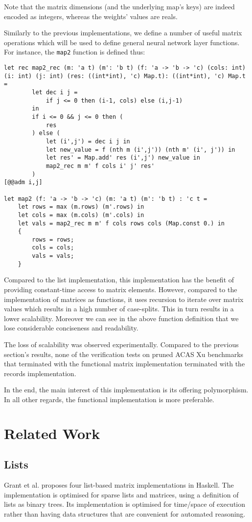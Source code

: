 \documentclass[runningheads]{llncs}
\begin{document}
Note that the matrix dimensions (and the underlying map's keys) are indeed encoded as integers, whereas the weights' values are reals. 

Similarly to the previous implementations, we define a number of useful matrix operations which will be used to define general neural network layer functions. For instance, the \lstinline{map2} function is defined thus:

\begin{lstlisting}[language=caml, label={lst:map2_records}]
let rec map2_rec (m: 'a t) (m': 'b t) (f: 'a -> 'b -> 'c) (cols: int) (i: int) (j: int) (res: ((int*int), 'c) Map.t): ((int*int), 'c) Map.t =
		let dec i j = 
			if j <= 0 then (i-1, cols) else (i,j-1)     
		in
		if i <= 0 && j <= 0 then (
			res
		) else (
			let (i',j') = dec i j in
			let new_value = f (nth m (i',j')) (nth m' (i', j')) in
			let res' = Map.add' res (i',j') new_value in
			map2_rec m m' f cols i' j' res'
		)
[@@adm i,j]

let map2 (f: 'a -> 'b -> 'c) (m: 'a t) (m': 'b t) : 'c t = 
	let rows = max (m.rows) (m'.rows) in
	let cols = max (m.cols) (m'.cols) in
	let vals = map2_rec m m' f cols rows cols (Map.const 0.) in
	{
		rows = rows;
		cols = cols;
		vals = vals;
	}
\end{lstlisting} 

Compared to the list implementation, this implementation has the benefit of providing constant-time access to matrix elements. However, compared to the implementation of matrices as functions, it uses recursion to iterate over matrix values which results in a high number of case-splits. This in turn results in a lower scalability. Moreover we can see in the above function definition that we lose considerable conciseness and readability.

The loss of scalability was observed experimentally. Compared to the previous section's results, none of the verification tests on pruned ACAS Xu benchmarks that terminated with the functional matrix implementation terminated with the records implementation.

In the end, the main interest of this implementation is its offering polymorphism. In all other regards, the functional implementation is more preferable.

\iffalse
\section{Related Work}
\subsection{Lists}
Grant et al. \cite{grant_sparse_1996} proposes four list-based matrix implementations in Haskell. The implementation is optimised for sparse lists and matrices, using a definition of lists as binary trees. Its implementation is optimised for time/space of execution rather than having data structures that are convenient for automated reasoning.
\end{document}
